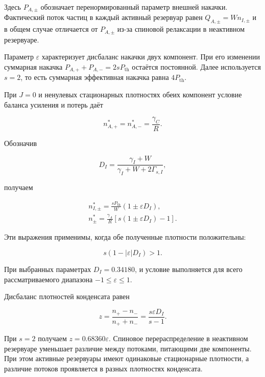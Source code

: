 \documentclass[12pt,a4paper]{article}
\begin{document}
Здесь \(P_{A,\pm}\) обозначает перенормированный параметр внешней накачки. Фактический поток частиц в каждый активный резервуар равен \(Q_{A,\pm}=Wn_{I,\pm}\) и в общем случае отличается от \(P_{A,\pm}\) из-за спиновой релаксации в неактивном резервуаре.

Параметр \(\varepsilon\) характеризует дисбаланс накачки двух компонент. При его изменении суммарная накачка \(P_{A,+}+P_{A,-}=2sP_{\mathrm{th}}\) остаётся постоянной. Далее используется \(s=2\), то есть суммарная эффективная накачка равна \(4P_{\mathrm{th}}\).

При \(J=0\) и ненулевых стационарных плотностях обеих компонент условие баланса усиления и потерь даёт

\[
n_{A,+}^*=n_{A,-}^*=\frac{\gamma_C}{R}.
\]

Обозначив

\[
D_I=
\frac{\gamma_I+W}
{\gamma_I+W+2\Gamma_{s,I}},
\]

\noindent\begin{minipage}{\textwidth}
получаем

\begin{equation}\label{eq:6}
\begin{gathered}
n_{I,\pm}^*
=
\frac{sP_{\mathrm{th}}}{W}(1\pm\varepsilon D_I),\\[0.5em]
n_\pm^*
=
\frac{\gamma_A}{R}
\left[s(1\pm\varepsilon D_I)-1\right].
\end{gathered}
\end{equation}
\end{minipage}
\par\medskip

Эти выражения применимы, когда обе полученные плотности положительны:

\[
s(1-|\varepsilon|D_I)>1.
\]

При выбранных параметрах \(D_I=0.34180\), и условие выполняется для всего рассматриваемого диапазона \(-1\leq\varepsilon\leq1\).

Дисбаланс плотностей конденсата равен

\begin{equation}\label{eq:7}
z=
\frac{n_+-n_-}{n_++n_-}
=
\frac{s\varepsilon D_I}{s-1}.
\end{equation}

При \(s=2\) получаем \(z=0.68360\varepsilon\). Спиновое перераспределение в неактивном резервуаре уменьшает различие между потоками, питающими две компоненты. При этом активные резервуары имеют одинаковые стационарные плотности, а различие потоков проявляется в разных плотностях конденсата.
\end{document}
